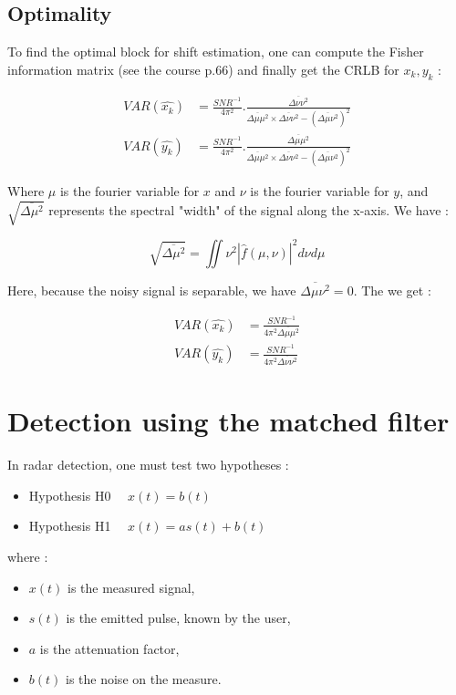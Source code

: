 \subsection{Optimality}
To find the optimal block for shift estimation, one can compute the Fisher information matrix (see the course p.66) and finally get the CRLB for $x_k, y_k$ :


\begin{align*}
VAR(\hat{x_k}) & = \frac{SNR^{-1}}{4\pi^2} . \frac{\overline{\Delta \nu \nu^2}}{\overline{\Delta \mu \mu^2} \times \overline{\Delta \nu \nu^2} - \left( \overline{\Delta \mu \nu^2} \right)^2} \\
VAR(\hat{y_k}) & = \frac{SNR^{-1}}{4\pi^2} . \frac{\overline{\Delta \mu \mu^2}}{\overline{\Delta \mu \mu^2} \times \overline{\Delta \nu \nu^2} - \left( \overline{\Delta \mu \nu^2} \right)^2}
\end{align*}


Where $\mu$ is the fourier variable for $x$ and $\nu$ is the fourier variable for $y$, and $\sqrt{\overline{\Delta \mu^2}}$ represents the spectral "width" of the signal along the x-axis. We have :

$$
\sqrt{\overline{\Delta \mu^2}} = \iint \nu^2 |\hat{f}(\mu,\nu)|^2 d\nu d\mu
$$

Here, because the noisy signal is separable, we have $ \overline{\Delta \mu \nu^2} = 0 $. The we get :


\begin{align*}
VAR(\hat{x_k}) & = \frac{SNR^{-1}}{4\pi^2\overline{\Delta \mu \mu^2}} \\
VAR(\hat{y_k}) & = \frac{SNR^{-1}}{4\pi^2\overline{\Delta \nu \nu^2}}
\end{align*}

\section{Detection using the matched filter}
In radar detection, one must test two hypotheses :
\begin{itemize}
    \item Hypothesis H0 $\quad x(t)=b(t)$
    \item Hypothesis H1 $\quad x(t)=a s(t)+b(t)$
\end{itemize}
where :

\begin{itemize}
    \item $x(t)$ is the measured signal,
    \item $s(t)$ is the emitted pulse, known by the user,
    \item $a$ is the attenuation factor,
    \item $b(t)$ is the noise on the measure.
\end{itemize}


